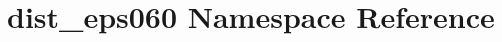 \hypertarget{namespacedist__eps060}{}\section{dist\+\_\+eps060 Namespace Reference}
\label{namespacedist__eps060}
